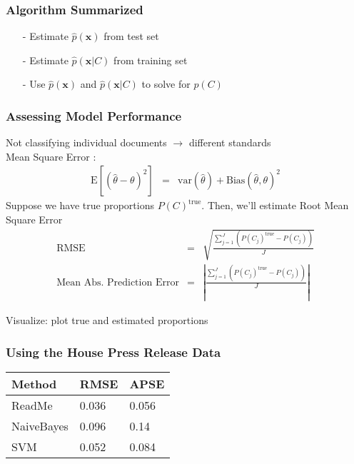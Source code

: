 \documentclass{beamer}
\numberwithin{equation}{section}
\begin{document}
\begin{frame}
\frametitle{Algorithm Summarized}

\begin{itemize}
\item[-] Estimate $\hat{p}(\boldsymbol{x})$ from test set
\item[-] Estimate $\hat{p}(\boldsymbol{x}|C)$ from training set
\item[-] Use $\hat{p}(\boldsymbol{x})$ and $\hat{p}(\boldsymbol{x}|C)$ to solve for $p(C)$
\end{itemize}


\end{frame}


\begin{frame}
\frametitle{Assessing Model Performance}

Not classifying individual documents $\rightarrow$ different standards\\
\alert{Mean Square Error} :
\begin{eqnarray}
\text{E}[(\hat{\theta} - \theta) ^2] & = & \text{var} (\hat{\theta} ) + \text{Bias}(\hat{\theta},  \theta)^2 \nonumber
\end{eqnarray}
Suppose we have true proportions $P(C)^{\text{true}}$.  Then, we'll estimate \alert{Root Mean Square Error }
\begin{eqnarray}
\text{RMSE} & = & \sqrt{ \frac{\sum_{j=1}^{J} (P(C_j)^{\text{true}} - P(C_j) ) } {J} } \nonumber \\
\text{Mean Abs. Prediction Error} & = & | \frac{\sum_{j=1}^{J} (P(C_j)^{\text{true}} - P(C_j) ) } {J} | \nonumber
\end{eqnarray}

\alert{Visualize}: plot true and estimated proportions


\end{frame}


\begin{frame}
\begin{center}
\end{center}

\end{frame}

\begin{frame}
\frametitle{Using the House Press Release Data}

\begin{tabular}{lll}
\hline\hline
Method & RMSE & APSE  \\
\hline
ReadMe &  0.036  & 0.056 \\
NaiveBayes & 0.096 & 0.14 \\
SVM & 0.052 & 0.084 \\
\hline
\end{tabular}


\end{frame}
\end{document}
